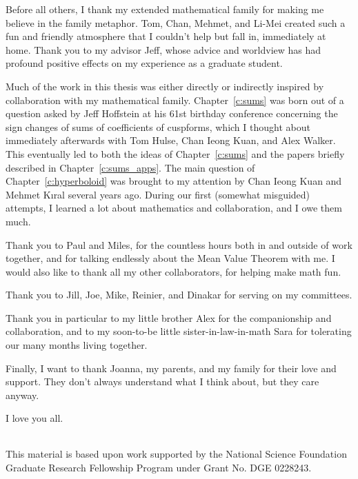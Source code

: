 

Before all others, I thank my extended mathematical family for making me believe in the
family metaphor.
Tom, Chan, Mehmet, and Li-Mei created such a fun and friendly atmosphere that I couldn't
help but fall in, immediately at home.
Thank you to my advisor Jeff, whose advice and worldview has had profound positive effects
on my experience as a graduate student.


Much of the work in this thesis was either directly or indirectly inspired by
collaboration with my mathematical family.
Chapter~\ref{c:sums} was born out of a question asked by Jeff Hoffstein at his 61st
birthday conference concerning the sign changes of sums of coefficients of cuspforms,
which I thought about immediately afterwards with Tom Hulse, Chan Ieong Kuan, and Alex
Walker.
This eventually led to both the ideas of Chapter~\ref{c:sums} and the papers briefly
described in Chapter~\ref{c:sums_apps}.
The main question of Chapter~\ref{c:hyperboloid} was brought to my attention by Chan Ieong
Kuan and Mehmet K{\i}ral several years ago.
During our first (somewhat misguided) attempts, I learned a lot about mathematics and
collaboration, and I owe them much.


Thank you to Paul and Miles, for the countless hours both in and outside of work together,
and for talking endlessly about the Mean Value Theorem with me.
I would also like to thank all my other collaborators, for helping make math fun.


Thank you to Jill, Joe, Mike, Reinier, and Dinakar for serving on my committees.


Thank you in particular to my little brother Alex for the companionship and collaboration,
and to my soon-to-be little sister-in-law-in-math Sara for tolerating our many months
living together.


Finally, I want to thank Joanna, my parents, and my family for their love and support.
They don't always understand what I think about, but they care anyway.


I love you all.

\noindent
\begin{tabular*}{\textwidth}{c}
  \midrule
\end{tabular*}
This material is based upon work supported by the National Science Foundation Graduate
Research Fellowship Program under Grant No. DGE 0228243.


